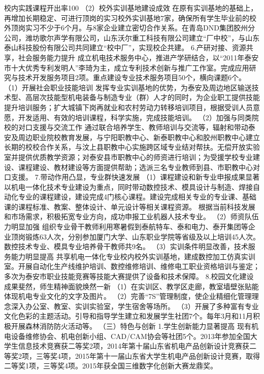 校内实践课程开出率100%
（2）校外实训基地建设成效
在原有实训基地的基础上，再增加长期稳定、可进行顶岗的实习校外实训基地7家，确保所有学生毕业前的校外顶岗实习不少于6个月。与8家企业建立密切合作关系。在青岛DND集团胶州分公司，潍坊歌尔声学有限公司，山东沃尔重工科技有限公司建立“厂中校”，与山东泰山科技股份有限公司共同建立“校中厂”，实现校企共建。 
6.产研对接、资源共享，社会服务能力提升
成立机电技术服务中心，推进产学研结合，以“2011年泰安市十大优秀专利发明人”李琦为主，成立专利技术创新与推广工作室。完成应用研究与技术开发服务项目2项。重点建设专业技术服务项目50个，横向课题6个。
（1）开展社会职业技能培训 
发挥专业实训基地的优势，为泰安及周边地区输送技术型、高层次技能型机电装备与制造专业（群）人才的同时，为企业职工提供技能提升培训服务；扩大城镇下岗再就业和农村劳动力转移培训项目，根据受训人员意愿，开发适用、有效的培训课程，科学实施，完成技能培训。
（2）加强与同类院校的对口支援与交流工作
通过联合培养学生、教师培训与交流等，辐射和带动泰安及周边职业院校教育发展，与宁阳职教中心、新泰职教中心和胶州职教中心建立长期的校校合作关系，与汶上县职教中心实施跨区域专业结对帮扶。无偿开放实验室并提供优质教学资源；对泰安县市职教中心的师资进行培训；为受援学校专业建设、课程建设、教材建设等方面提供帮助；选派三名专业教师到县、市职教中心对口支援。
7.带动作用凸显，专业群快速发展
（1）课程建设和新专业申报成果显著
以机电一体化技术专业建设为重点，同时带动数控技术、模具设计与制造、焊接自动化专业的课程建设，建设完成4门核心课程。建设完成相关专业的专业课、基础课的课程标准、教案、整体设计、单元设计等相关课程资源。
根据当前科技发展和市场需求，积极拓宽专业方向，成功申报工业机器人技术专业。
（2）师资队伍力明显加强
组织专业骨干教师利用寒暑假到泰航特车、泰和电力、泰开集团等企业顶岗锻炼63人次，分别参加厦门大学、山东职业学院等省级及以上培训45人次。数控技术专业、模具专业培养骨干教师共9名。
（3）实训条件明显改善，技术服务能力明显提高
共享机电一体化专业校内校外实训基地，建成数控加工仿真实训室。开展自动化生产线维护培训、数控维修培训、维修电工职业资格培训与鉴定；多次为泰安市职业技能竞赛等技能大赛提供了设备和技术保障。
8.校园文化建设成果斐然，师生精神面貌焕然一新
（1）在实训区、教学区走廊，教室墙壁张贴能体现机电专业文化的文字及图片。
（2）完善“7S”管理制度，使企业精细化管理理念深入办公室、教室、实训实验室，学生宿舍等场所。
（3）开展了多种富有专业文化色彩的主题活动。引导和指导学生建立和发展学生社团7个。每年3月和11月积极开展森林消防防火活动等。
（三）特色与创新
1.学生创新能力显著提高
现有机电设备维修协会、机电创新小组、CAD/CAM协会等社团5个。2013年参加全国大学生信息技术竞赛获二等奖2项，2014年第十届山东省机电产品创新设计竞赛获二等奖2项，三等奖4项，2015年第十一届山东省大学生机电产品创新设计竞赛，取得二等奖1项，三等奖4项。2015年获全国三维数字化创新大赛龙鼎奖。
